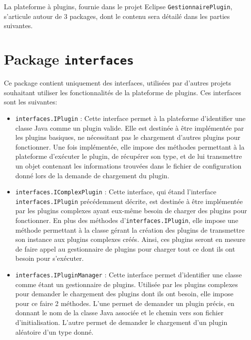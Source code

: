 
La plateforme à plugins, fournie dans le projet Eclipse \texttt{GestionnairePlugin}, s'articule autour de 3 packages, dont le contenu sera détailé dans les parties suivantes.


\section{Package \texttt{interfaces}}

Ce package contient uniquement des interfaces, utilisées par d'autres projets souhaitant utiliser les fonctionnalités de la plateforme de plugins. Ces interfaces sont les suivantes:\\

\begin{itemize}
	\item \texttt{interfaces.IPlugin} : Cette interface permet à la plateforme d'identifier une classe Java comme un plugin valide. Elle est destinée à être implémentée par les plugins basiques, ne nécessitant pas le chargement d'autres plugins pour fonctionner. Une fois implémentée, elle impose des méthodes permettant à la plateforme d'exécuter le plugin, de récupérer son type, et de lui transmettre un objet contenant les informations trouvées dans le fichier de configuration donné lors de la demande de chargement du plugin.
	\item \texttt{interfaces.IComplexPlugin} : Cette interface, qui étand l'interface \texttt{interfaces.IPlugin} précédemment décrite, est destinée à être implémentée par les plugins complexes ayant eux-même besoin de charger des plugins pour fonctionner. En plus des méthodes d'\texttt{interfaces.IPlugin}, elle impose une méthode permettant à la classe gérant la création des plugins de transmettre son instance aux plugins complexes créés. Ainsi, ces plugins seront en mesure de faire appel au gestionnaire de plugins pour charger tout ce dont ils ont besoin pour s'exécuter.
	\item \texttt{interfaces.IPluginManager} :  Cette interface permet d'identifier une classe comme étant un gestionnaire de plugins. Utilisée par les plugins complexes pour demander le chargement des plugins dont ils ont besoin, elle impose pour ce faire 2 méthodes. L'une permet de demander un plugin précis, en donnant le nom de la classe Java associée et le chemin vers son fichier d'initialisation. L'autre permet de demander le chargement d'un plugin aléatoire d'un type donné.
\end{itemize}


